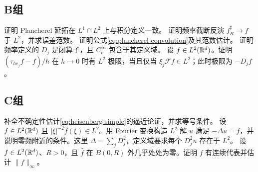 \subsection*{B组}
\begin{enumerate}[label=\textbf{\thechapter.\arabic*.},resume]
证明 Plancherel 延拓在 \(L^1\cap L^2\) 上与积分定义一致。
证明频率截断反演 \(f_R^\sharp\to f\) 于 \(L^2\)，并求误差范数。
证明公式\eqref{eq:plancherel-convolution}及其范数估计。
证明频率定义的 \(D_j\) 是闭算子，且 \(C_c^\infty\) 包含于其定义域。
设 \(f\in L^2(\mathbb{R}^d)\)。证明
\((\tau_{he_j}f-f)/h\) 在 \(h\to0\) 时有 \(L^2\) 极限，当且仅当
\(\xi_j\mathcal Ff\in L^2\)；此时极限为 \(-D_jf\)。
\end{enumerate}
\subsection*{C组}
\begin{enumerate}[label=\textbf{\thechapter.\arabic*.},resume]
补全不确定性估计\eqref{eq:heisenberg-simple}的逼近论证，并求等号条件。
设 \(f\in L^2(\mathbb{R}^d)\) 且 \(|\xi|^{-2}\widehat f(\xi)\in L^2\)。用 Fourier 变换构造 \(L^2\) 解 \(u\) 满足 \(-\Delta u=f\)，并说明零频附近的条件。这里 \(\Delta=\sum_jD_j^2\)，定义域要求每个 \(D_j^2u\) 存在于 \(L^2\)。
设 \(f\in L^2(\mathbb{R}^d)\)、\(R>0\)，且 \(\widehat f\) 在 \(B(0,R)\) 外几乎处处为零。证明 \(f\) 有连续代表并估计 \(\|f\|_\infty\)。
\end{enumerate}
